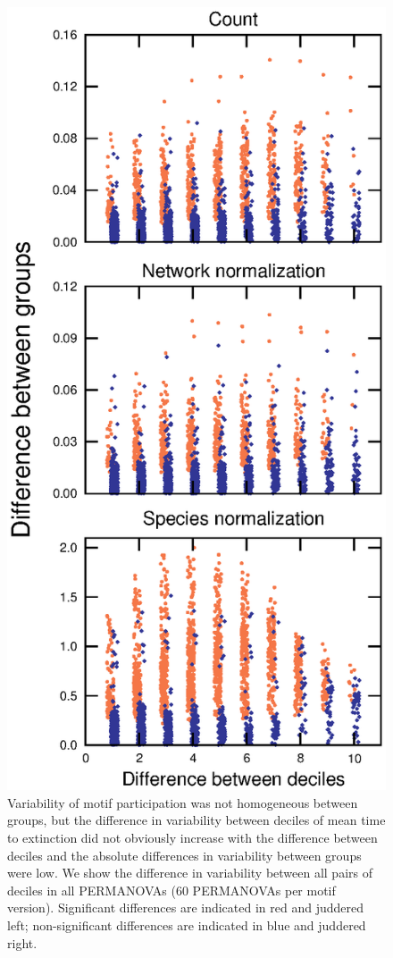 \documentclass[12pt]{article}
\begin{document}
        \begin{figure}[hb!]
            \centering
            \includegraphics[height=.75\textheight]{figures/Tukey_differences.eps}
            \caption{Variability of motif participation was not homogeneous between groups, but the difference in variability between deciles of mean time to extinction did not obviously increase with the difference between deciles and the absolute differences in variability between groups were low. We show the difference in variability between all pairs of deciles in all PERMANOVAs (60 PERMANOVAs per motif version). Significant differences are indicated in red and juddered left; non-significant differences are indicated in blue and juddered right.}
            \label{fig:betadisper_Tukey}
        \end{figure}
\end{document}
